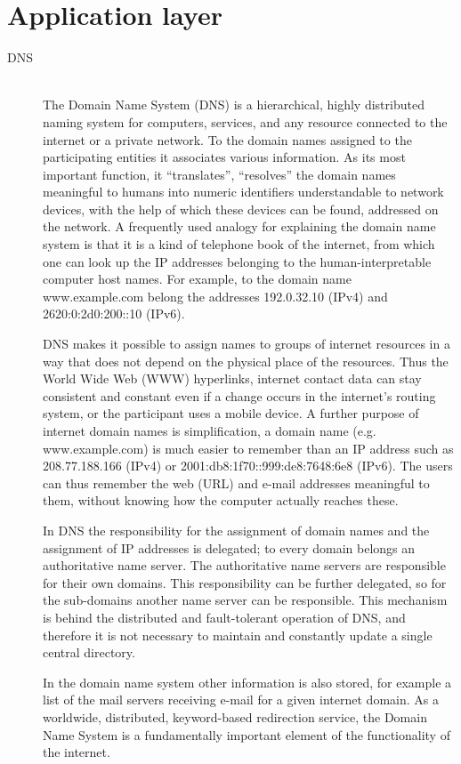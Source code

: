 \documentclass[margin=0px]{article}
\begin{document}
\section{Application layer}
\begin{description}
    \item[DNS] \hfill \\
        The Domain Name System (DNS) is a hierarchical, highly distributed naming system for computers, services, and any resource connected to the internet or a private network. To the domain names assigned to the participating entities it associates various information. As its most important function, it ``translates'', ``resolves'' the domain names meaningful to humans into numeric identifiers understandable to network devices, with the help of which these devices can be found, addressed on the network.
        A frequently used analogy for explaining the domain name system is that it is a kind of telephone book of the internet, from which one can look up the IP addresses belonging to the human-interpretable computer host names. For example, to the domain name www.example.com belong the addresses 192.0.32.10 (IPv4) and 2620:0:2d0:200::10 (IPv6).

        DNS makes it possible to assign names to groups of internet resources in a way that does not depend on the physical place of the resources. Thus the World Wide Web (WWW) hyperlinks, internet contact data can stay consistent and constant even if a change occurs in the internet's routing system, or the participant uses a mobile device. A further purpose of internet domain names is simplification, a domain name (e.g. www.example.com) is much easier to remember than an IP address such as 208.77.188.166 (IPv4) or 2001:db8:1f70::999:de8:7648:6e8 (IPv6). The users can thus remember the web (URL) and e-mail addresses meaningful to them, without knowing how the computer actually reaches these.

        In DNS the responsibility for the assignment of domain names and the assignment of IP addresses is delegated; to every domain belongs an authoritative name server. The authoritative name servers are responsible for their own domains. This responsibility can be further delegated, so for the sub-domains another name server can be responsible. This mechanism is behind the distributed and fault-tolerant operation of DNS, and therefore it is not necessary to maintain and constantly update a single central directory.

        In the domain name system other information is also stored, for example a list of the mail servers receiving e-mail for a given internet domain. As a worldwide, distributed, keyword-based redirection service, the Domain Name System is a fundamentally important element of the functionality of the internet.


\end{description}
\end{document}
